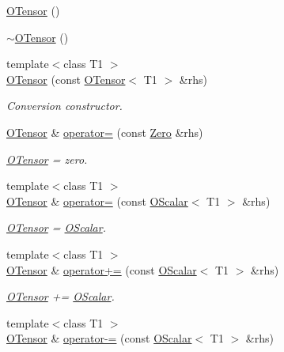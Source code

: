 \begin{DoxyCompactItemize}
\item 
\mbox{\hyperlink{classENSEM_1_1OTensor_a514d20086c92e7b19386708978d34483}{O\+Tensor}} ()
\item 
\mbox{\hyperlink{classENSEM_1_1OTensor_a7be6a7cdba7403be29ede1f21ee706f7}{$\sim$\+O\+Tensor}} ()
\item 
{\footnotesize template$<$class T1 $>$ }\\\mbox{\hyperlink{classENSEM_1_1OTensor_a49dbc01d4f79e52900b10dd220cdc546}{O\+Tensor}} (const \mbox{\hyperlink{classENSEM_1_1OTensor}{O\+Tensor}}$<$ T1 $>$ \&rhs)
\begin{DoxyCompactList}\small\item\em Conversion constructor. \end{DoxyCompactList}\item 
\mbox{\hyperlink{classENSEM_1_1OTensor}{O\+Tensor}} \& \mbox{\hyperlink{classENSEM_1_1OTensor_aae562552ce915d3d39c65dfe463fa50a}{operator=}} (const \mbox{\hyperlink{structENSEM_1_1Zero}{Zero}} \&rhs)
\begin{DoxyCompactList}\small\item\em \mbox{\hyperlink{classENSEM_1_1OTensor}{O\+Tensor}} = zero. \end{DoxyCompactList}\item 
{\footnotesize template$<$class T1 $>$ }\\\mbox{\hyperlink{classENSEM_1_1OTensor}{O\+Tensor}} \& \mbox{\hyperlink{classENSEM_1_1OTensor_ae763ca68be1d6b8d5b27b8d544ab5f2d}{operator=}} (const \mbox{\hyperlink{classENSEM_1_1OScalar}{O\+Scalar}}$<$ T1 $>$ \&rhs)
\begin{DoxyCompactList}\small\item\em \mbox{\hyperlink{classENSEM_1_1OTensor}{O\+Tensor}} = \mbox{\hyperlink{classENSEM_1_1OScalar}{O\+Scalar}}. \end{DoxyCompactList}\item 
{\footnotesize template$<$class T1 $>$ }\\\mbox{\hyperlink{classENSEM_1_1OTensor}{O\+Tensor}} \& \mbox{\hyperlink{classENSEM_1_1OTensor_a93fe0d4638104ad0f6bdaf5de7760276}{operator+=}} (const \mbox{\hyperlink{classENSEM_1_1OScalar}{O\+Scalar}}$<$ T1 $>$ \&rhs)
\begin{DoxyCompactList}\small\item\em \mbox{\hyperlink{classENSEM_1_1OTensor}{O\+Tensor}} += \mbox{\hyperlink{classENSEM_1_1OScalar}{O\+Scalar}}. \end{DoxyCompactList}\item 
{\footnotesize template$<$class T1 $>$ }\\\mbox{\hyperlink{classENSEM_1_1OTensor}{O\+Tensor}} \& \mbox{\hyperlink{classENSEM_1_1OTensor_a61ebd11eac882623ea080293b007972b}{operator-\/=}} (const \mbox{\hyperlink{classENSEM_1_1OScalar}{O\+Scalar}}$<$ T1 $>$ \&rhs)

\end{DoxyCompactItemize}
